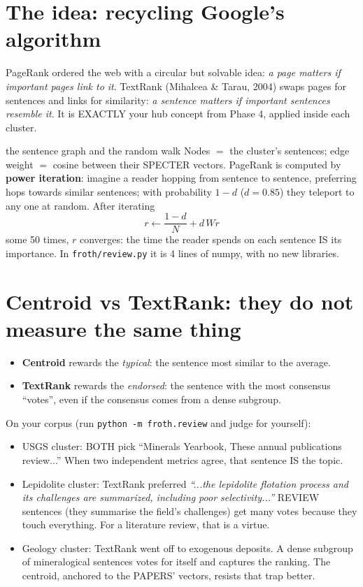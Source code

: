 \documentclass[11pt,a4paper]{article}
\begin{document}

\section{The idea: recycling Google's algorithm}

PageRank ordered the web with a circular but solvable idea: \emph{a page matters if important
pages link to it}. TextRank (Mihalcea \& Tarau, 2004) swaps pages for sentences and links for
similarity: \emph{a sentence matters if important sentences resemble it}. It is EXACTLY your
hub concept from Phase 4, applied inside each cluster.

\begin{concepto}{the sentence graph and the random walk}
Nodes $=$ the cluster's sentences; edge weight $=$ cosine between their SPECTER vectors.
PageRank is computed by \textbf{power iteration}: imagine a reader hopping from sentence to
sentence, preferring hops towards similar sentences; with probability $1-d$ ($d=0.85$) they
teleport to any one at random. After iterating
\[
r \leftarrow \frac{1-d}{N} + d \, W r
\]
some 50 times, $r$ converges: the time the reader spends on each sentence IS its importance.
In \texttt{froth/review.py} it is 4 lines of numpy, with no new libraries.
\end{concepto}

\section{Centroid vs TextRank: they do not measure the same thing}

\begin{itemize}
  \item \textbf{Centroid} rewards the \emph{typical}: the sentence most similar to the average.
  \item \textbf{TextRank} rewards the \emph{endorsed}: the sentence with the most consensus
        ``votes'', even if the consensus comes from a dense subgroup.
\end{itemize}

On your corpus (run \texttt{python -m froth.review} and judge for yourself):

\begin{itemize}
  \item USGS cluster: BOTH pick ``Minerals Yearbook, These annual publications review...''
        When two independent metrics agree, that sentence IS the topic.
  \item Lepidolite cluster: TextRank preferred \emph{``...the lepidolite flotation process and
        its challenges are summarized, including poor selectivity...''} REVIEW sentences (they
        summarise the field's challenges) get many votes because they touch everything. For a
        literature review, that is a virtue.
  \item Geology cluster: TextRank went off to exogenous deposits. A dense subgroup of
        mineralogical sentences votes for itself and captures the ranking. The centroid,
        anchored to the PAPERS' vectors, resists that trap better.
\end{itemize}
\end{document}
